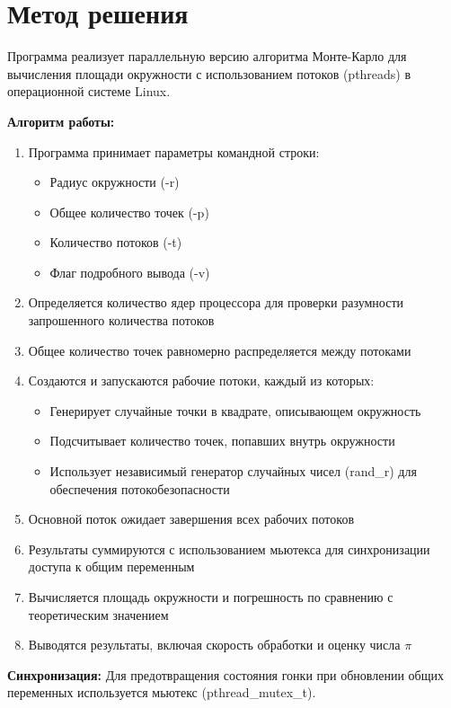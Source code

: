 \section{Метод решения}
Программа реализует параллельную версию алгоритма Монте-Карло для вычисления площади окружности с использованием потоков (pthreads) в операционной системе Linux.

{\bfseries Алгоритм работы:}
\begin{enumerate}
    \item Программа принимает параметры командной строки:
    \begin{itemize}
        \item Радиус окружности (-r)
        \item Общее количество точек (-p)
        \item Количество потоков (-t)
        \item Флаг подробного вывода (-v)
    \end{itemize}
    \item Определяется количество ядер процессора для проверки разумности запрошенного количества потоков
    \item Общее количество точек равномерно распределяется между потоками
    \item Создаются и запускаются рабочие потоки, каждый из которых:
    \begin{itemize}
        \item Генерирует случайные точки в квадрате, описывающем окружность
        \item Подсчитывает количество точек, попавших внутрь окружности
        \item Использует независимый генератор случайных чисел (rand\_r) для обеспечения потокобезопасности
    \end{itemize}
    \item Основной поток ожидает завершения всех рабочих потоков
    \item Результаты суммируются с использованием мьютекса для синхронизации доступа к общим переменным
    \item Вычисляется площадь окружности и погрешность по сравнению с теоретическим значением
    \item Выводятся результаты, включая скорость обработки и оценку числа $\pi$
\end{enumerate}

{\bfseries Синхронизация:}
Для предотвращения состояния гонки при обновлении общих переменных используется мьютекс (pthread\_mutex\_t).

